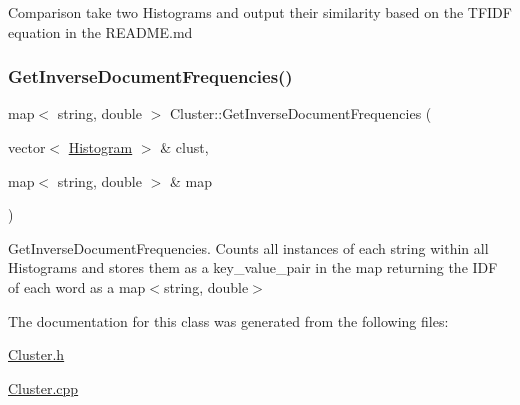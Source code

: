 Comparison take two Histograms and output their similarity based on the T\+F\+I\+DF equation in the R\+E\+A\+D\+M\+E.\+md \mbox{\label{classCluster_ada4f897af1294c97e3ff2f8023a92b55}} 
\subsubsection{\texorpdfstring{Get\+Inverse\+Document\+Frequencies()}{GetInverseDocumentFrequencies()}}
{\footnotesize\ttfamily map$<$ string, double $>$ Cluster\+::\+Get\+Inverse\+Document\+Frequencies (\begin{DoxyParamCaption}\item[{vector$<$ \hyperlink{classHistogram}{Histogram} $>$ \&}]{clust,  }\item[{map$<$ string, double $>$ \&}]{map }\end{DoxyParamCaption})}

Get\+Inverse\+Document\+Frequencies. Counts all instances of each string within all Histograms and stores them as a key\+\_\+value\+\_\+pair in the map returning the I\+DF of each word as a map$<$string, double$>$ 

The documentation for this class was generated from the following files\+:\begin{DoxyCompactItemize}
\item 
\hyperlink{Cluster_8h}{Cluster.\+h}\item 
\hyperlink{Cluster_8cpp}{Cluster.\+cpp}\end{DoxyCompactItemize}
